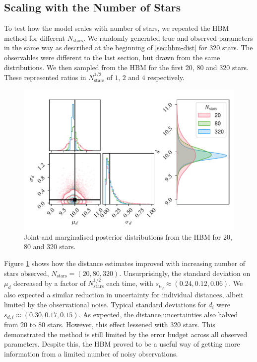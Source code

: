 \subsection{Scaling with the Number of Stars}\label{sec:hbm-scale}

To test how the model scales with number of stars, we repeated the HBM method for different \(N_\mathrm{stars}\). We randomly generated true and observed parameters in the same way as described at the beginning of \ref{sec:hbm-dist} for 320 stars. The observables were different to the last section, but drawn from the same distributions. We then sampled from the HBM for the first 20, 80 and 320 stars. These represented ratios in \(N_\mathrm{stars}^{1/2}\) of \(1\), \(2\) and \(4\) respectively.

\begin{figure}[tb]
    \centering
    \includegraphics{figures/hbm-extended.pdf}
    \caption{Joint and marginalised posterior distributions from the HBM for 20, 80 and 320 stars.}
    \label{fig:hbm-extended}
\end{figure}

Figure \ref{fig:hbm-extended} shows how the distance estimates improved with increasing number of stars observed, \(N_\mathrm{stars}=(20,80,320)\). Unsurprisingly, the standard deviation on \(\mu_d\) decreased by a factor of \(N_\mathrm{stars}^{1/2}\) each time, with \(s_{\mu_d} \approx (0.24, 0.12, 0.06)\). We also expected a similar reduction in uncertainty for individual distances, albeit limited by the observational noise. Typical standard deviations for \(d_i\) were \(s_{d,i} \approx (0.30, 0.17, 0.15)\). As expected, the distance uncertainties also halved from \(20\) to \(80\) stars. However, this effect lessened with 320 stars. This demonstrated the method is still limited by the error budget across all observed parameters. Despite this, the HBM proved to be a useful way of getting more information from a limited number of noisy observations. 

